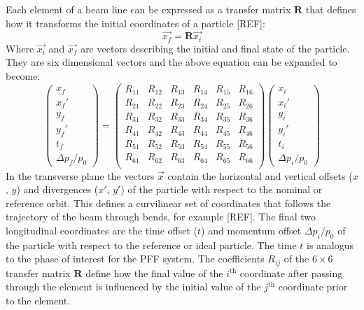 Each element of a beam line can be expressed as a transfer matrix \(\mathbf{R}\) that defines how it transforms the initial coordinates of a particle [REF]:
\begin{equation}
\vec{x_f} = \mathbf{R}\vec{x_i}
\end{equation}
Where \(\vec{x_i}\) and \(\vec{x_f}\) are vectors describing the initial and final state of the particle. They are six dimensional vectors and the above equation can be expanded to become:
\begin{equation}
\left( \begin{array}{c} x_f \\ x_f' \\ y_f \\ y_f' \\ t_f \\ \Delta p_f/p_0 \end{array} \right)
=
\left( \begin{array}{cccccc} 
R_{11} & R_{12} & R_{13} & R_{14} & R_{15} & R_{16}\\ 
R_{21} & R_{22} & R_{23} & R_{24}  & R_{25} & R_{26}\\ 
R_{31} & R_{32} & R_{33} & R_{34}  & R_{35} & R_{36}\\
R_{41} & R_{42} & R_{43} & R_{44}  & R_{45} & R_{46}\\
R_{51} & R_{52} & R_{53} & R_{54}  & R_{55} & R_{56}\\
R_{61} & R_{62} & R_{63} & R_{64}  & R_{65} & R_{66}\\
\end{array} \right)
\left( \begin{array}{c} x_i \\ x_i' \\ y_i \\ y_i' \\ t_i \\ \Delta p_i/p_0 \end{array} \right)
\end{equation}
In the transverse plane the vectors \(\vec{x}\) contain the horizontal and vertical offsets (\(x\), \(y\)) and divergences (\(x'\), \(y'\)) of the particle with respect to the nominal or reference orbit. This defines a curvilinear set of coordinates that follows the trajectory of the beam through bends, for example [REF]. The final two longitudinal coordinates are the time offset (\(t\)) and momentum offset \(\Delta p_i/p_0\) of the particle with respect to the reference or ideal particle. The time \(t\) is analogus to the phase of interest for the PFF system. The coefficients \(R_{ij}\) of the \(6\times6\) transfer matrix \(\mathbf{R}\) define how the final value of the \(i^{\mathrm{th}}\) coordinate after passing through the element is influenced by the initial value of the \(j^{\mathrm{th}}\) coordinate prior to the element.

